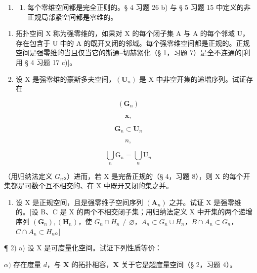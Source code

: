 \ExerciseSection

\begin{enumerate}
\def\labelenumi{\arabic{enumi})}
\tightlist
\item
  \begin{enumerate}
  \def\labelenumii{\alph{enumii})}
  \tightlist
  \item
    每个零维空间都是完全正则的。§ 4 习题 26 b) 与 § 5 习题 15 中定义的非正规局部紧空间都是零维的。
  \end{enumerate}
\end{enumerate}

\begin{enumerate}
\def\labelenumi{\alph{enumi})}
\setcounter{enumi}{1}
\item
  拓扑空间 X 称为强零维的，如果对 X 的每个闭子集 A 与 A 的每个邻域 U，存在包含于 U 中的 A 的既开又闭的邻域。每个强零维空间都是正规的。正规空间是强零维的当且仅当它的斯通–切赫紧化（§ 1，习题 7）是全不连通的{[}利用 § 4 习题 17 c){]}。
\item
  设 X 是强零维的豪斯多夫空间，\((\mathbf{U}_{n})\) 是 X 中非空开集的递增序列。试证存在
\end{enumerate}

\[
\left(\mathbf {G} _ {n}\right)
\]

\[
\mathbf {x},
\]

\[
\mathbf {G} _ {n} \subset \mathbf {U} _ {n}
\]

\[
n,
\]

\[
\bigcup_ {n} \mathrm{G} _ {n} = \bigcup_ {n} \mathrm{U} _ {n}
\]

（用归纳法定义 \(G_{n}\)。）进而，若 X 是完备正规的（§ 4，习题 8），则 X 的每个开集都是可数个互不相交的、在 X 中既开又闭的集之并。

\begin{enumerate}
\def\labelenumi{\alph{enumi})}
\setcounter{enumi}{3}
\tightlist
\item
  设 X 是正规空间，且是强零维子空间序列 \((\mathbf{A}_{n})\) 之并。试证 X 是强零维的。{[}设 B、C 是 X 的两个不相交闭子集；用归纳法定义 X 中开集的两个递增序列 \((\mathbf{G}_{n}), (\mathbf{H}_{n})\)，使 \(\overline{G}_{n} \cap \overline{H}_{n} \neq \varnothing\)，\(A_{n} \subset G_{n} \cup H_{n}\)，\(B \cap A_{n} \subset G_{n}\)，\(C \cap A_{n} \subset H_{n}\)。{]}
\end{enumerate}

¶ 2) a) 设 X 是可度量化空间。试证下列性质等价：

\(\alpha)\) 存在度量 \(d\)，与 \(\mathbf{X}\) 的拓扑相容，\(\mathbf{X}\) 关于它是超度量空间（§ 2，习题 4）。

